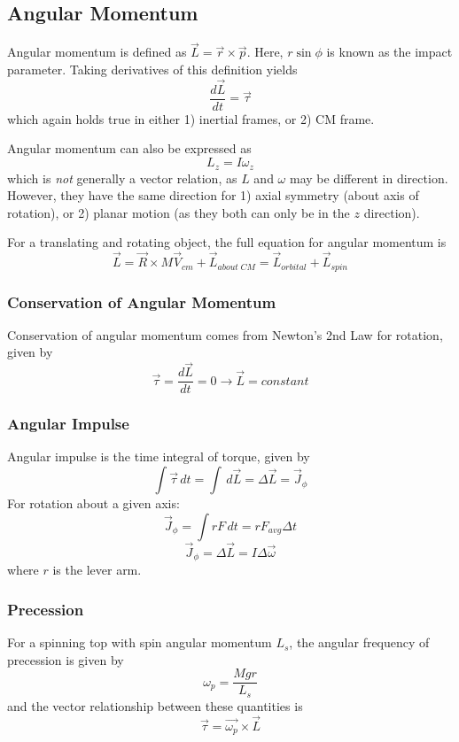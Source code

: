 \documentclass[../PhysicsFormulae.tex]{subfiles}
\begin{document}
\subsection{Angular Momentum}
Angular momentum is defined as $\vec{L}=\vec{r} \times \vec{p}$. Here, $r\sin{\phi}$ is known as the impact parameter. Taking derivatives of this definition yields
\[ \frac{d\vec{L}}{dt} = \vec{\tau} \]
which again holds true in either 1) inertial frames, or 2) CM frame. \bigskip

Angular momentum can also be expressed as
\[ L_z=I\omega_z \]
which is \textit{not} generally a vector relation, as $L$ and $\omega$ may be different in direction. However, they have the same direction for 1) axial symmetry (about axis of rotation), or 2) planar motion (as they both can only be in the $z$ direction).\bigskip

For a translating and rotating object, the full equation for angular momentum is
\[\vec{L} = \vec{R} \times M\vec{V}_{cm} + \vec{L}_{about \; CM} = \vec{L}_{orbital} + \vec{L}_{spin}\]

\subsubsection{Conservation of Angular Momentum}
Conservation of angular momentum comes from Newton's 2nd Law for rotation, given by
\[ \vec{\tau} = \frac{d\vec{L}}{dt} = 0 \rightarrow \vec{L} = constant \]

\subsubsection{Angular Impulse}
Angular impulse is the time integral of torque, given by 
\[ \int \vec{\tau} \,dt = \int \,d\vec{L} = \Delta \vec{L} = \vec{J}_{\phi} \]
For rotation about a given axis:
\[ \vec{J}_{\phi} = \int rF \,dt = rF_{avg} \Delta t \]
\[ \vec{J}_{\phi} = \Delta \vec{L} = I \Delta \vec{\omega} \]
where $r$ is the lever arm. 

\subsubsection{Precession}
For a spinning top with spin angular momentum $L_s$, the angular frequency of precession is given by
\[ \omega_p = \frac{Mgr}{L_s} \]
and the vector relationship between these quantities is
\[ \vec{\tau} = \vec{\omega_p} \times \vec{L} \]
\end{document}
